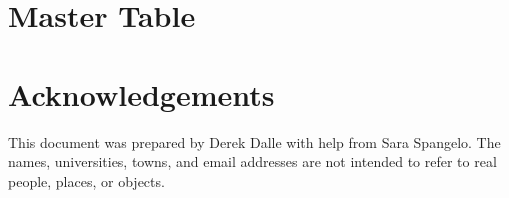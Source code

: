 \documentclass[]{aiaa-pretty}
\begin{document}
\appendix
\section{Master Table}
\label{app:mastertab}


\section*{Acknowledgements}
This document was prepared by Derek Dalle with help from Sara Spangelo.  The names, universities, towns, and email addresses are not intended to refer to real people, places, or objects.



\end{document}
